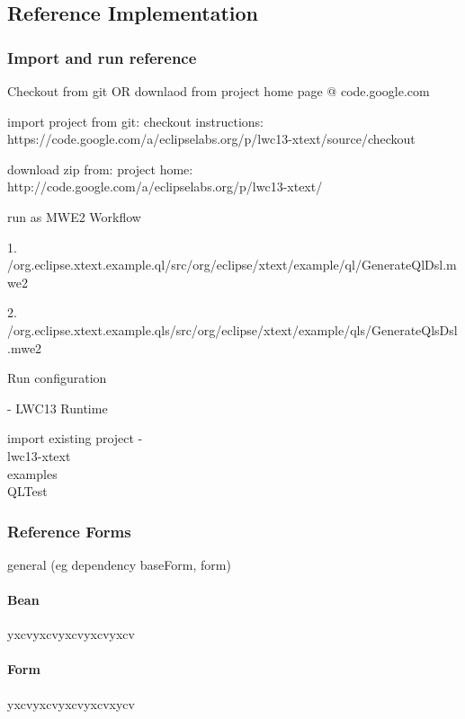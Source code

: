 \subsection{Reference Implementation}
\label{subsec:referenceImpl}





\subsubsection{Import and run reference}

Checkout from git OR downlaod from project home page @ code.google.com

import project from git:
checkout instructions:
https://code.google.com/a/eclipselabs.org/p/lwc13-xtext/source/checkout

download zip from:
project home: http://code.google.com/a/eclipselabs.org/p/lwc13-xtext/

run as MWE2 Workflow

1. /org.eclipse.xtext.example.ql/src/org/eclipse/xtext/example/ql/GenerateQlDsl.mwe2

2. /org.eclipse.xtext.example.qls/src/org/eclipse/xtext/example/qls/GenerateQlsDsl.mwe2

Run configuration

- LWC13 Runtime

import existing project
- \\lwc13-xtext\\examples\\QLTest



\subsubsection{Reference Forms}
\label{subsec:referenceForms}
general (eg dependency baseForm, form)

\paragraph{Bean}
yxcvyxcvyxcvyxcvyxcv

\paragraph{Form}
yxcvyxcvyxcvyxcvxycv




